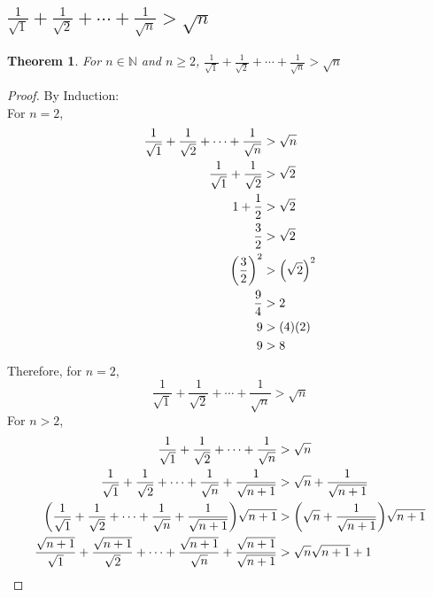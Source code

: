 \documentclass[]{article}
\newcommand{\N}{\mathbb{N}}
\newtheorem{theorem}{Theorem}
\begin{document}
\subsection{
    $\frac{1}{\sqrt{1}} + \frac{1}{\sqrt{2}} + \cdots + \frac{1}{\sqrt{n}} > \sqrt{n}$
}
\begin{theorem}
    For $n \in \N$ and $n \geq 2$,
    $\frac{1}{\sqrt{1}} + \frac{1}{\sqrt{2}} + \cdots + \frac{1}{\sqrt{n}} > \sqrt{n}$
\end{theorem}
\begin{proof}
    By Induction:\\
    For $n=2$,
    \begin{align*}
        \frac{1}{\sqrt{1}} + \frac{1}{\sqrt{2}} + \cdots + \frac{1}{\sqrt{n}} &> \sqrt{n}\\
        \frac{1}{\sqrt{1}} + \frac{1}{\sqrt{2}} &> \sqrt{2}\\
        1 + \frac{1}{2} &> \sqrt{2}\\
        \frac{3}{2} &> \sqrt{2}\\
        \qty(\frac{3}{2})^2 &> \qty(\sqrt{2})^2\\
        \frac{9}{4} &> 2\\
        9 &> (4)(2)\\
        9 &> 8 
    \end{align*}
    Therefore, for $n=2$,
    $$\frac{1}{\sqrt{1}} + \frac{1}{\sqrt{2}} + \cdots + \frac{1}{\sqrt{n}} > \sqrt{n}$$
    For $n>2$,
    \begin{align*}
        \frac{1}{\sqrt{1}} + \frac{1}{\sqrt{2}} + \cdots + \frac{1}{\sqrt{n}} 
            &> \sqrt{n}\\
        \frac{1}{\sqrt{1}} + \frac{1}{\sqrt{2}} + \cdots +
            \frac{1}{\sqrt{n}} + \frac{1}{\sqrt{n+1}}
            &> \sqrt{n} + \frac{1}{\sqrt{n+1}}\\
        \qty(\frac{1}{\sqrt{1}} + \frac{1}{\sqrt{2}} + \cdots +
            \frac{1}{\sqrt{n}} + \frac{1}{\sqrt{n+1}}) \sqrt{n+1}
            &> \qty(\sqrt{n} + \frac{1}{\sqrt{n+1}})\sqrt{n+1}\\
        \frac{\sqrt{n+1}}{\sqrt{1}} + \frac{\sqrt{n+1}}{\sqrt{2}} + \cdots + \frac{\sqrt{n+1}}{\sqrt{n}} + \frac{\sqrt{n+1}}{\sqrt{n+1}}
            &> \sqrt{n} \sqrt{n+1} + 1\\
    \end{align*}
\end{proof}

\end{document}

